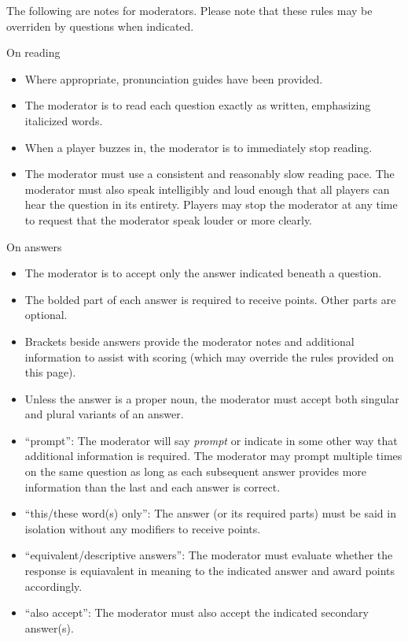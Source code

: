 \thispagestyle{empty}
The following are notes for moderators. Please note that these rules may be overriden by questions when indicated.

\vspace*{0.3 cm}
On reading
\begin{itemize}
    \item Where appropriate, pronunciation guides have been provided.
    \item The moderator is to read each question exactly as written, emphasizing italicized words.
    \item When a player buzzes in, the moderator is to immediately stop reading.
    \item The moderator must use a consistent and reasonably slow reading pace. The moderator must also speak intelligibly and loud enough that all players can hear the question in its entirety. Players may stop the moderator at any time to request that the moderator speak louder or more clearly.
\end{itemize}

\vspace*{0.3 cm}
On answers
\begin{itemize}
    \item The moderator is to accept only the answer indicated beneath a question.
    \item The bolded part of each answer is required to receive points. Other parts are optional.
    \item Brackets beside answers provide the moderator notes and additional information to assist with scoring (which may override the rules provided on this page).
    \item Unless the answer is a proper noun, the moderator must accept both singular and plural variants of an answer. 
    \item ``prompt'': The moderator will say \textit{prompt} or indicate in some other way that additional information is required. The moderator may prompt multiple times on the same question as long as each subsequent answer provides more information than the last and each answer is correct.
    \item ``this/these word(s) only'': The answer (or its required parts) must be said in isolation without any modifiers to receive points.
    \item ``equivalent/descriptive answers'': The moderator must evaluate whether the response is equiavalent in meaning to the indicated answer and award points accordingly.
    \item ``also accept'': The moderator must also accept the indicated secondary answer(s).
\end{itemize}


